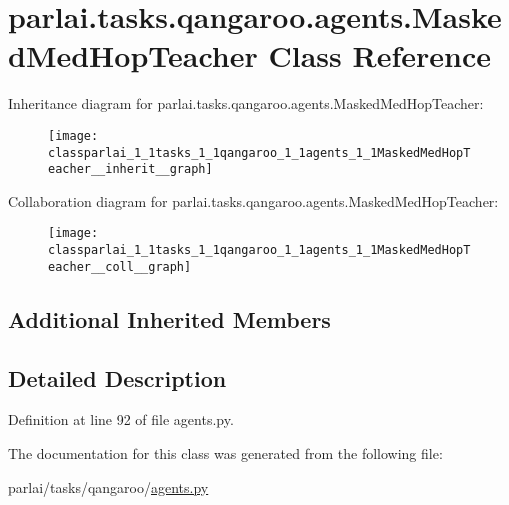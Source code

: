 \hypertarget{classparlai_1_1tasks_1_1qangaroo_1_1agents_1_1MaskedMedHopTeacher}{}\section{parlai.\+tasks.\+qangaroo.\+agents.\+Masked\+Med\+Hop\+Teacher Class Reference}
\label{classparlai_1_1tasks_1_1qangaroo_1_1agents_1_1MaskedMedHopTeacher}


Inheritance diagram for parlai.\+tasks.\+qangaroo.\+agents.\+Masked\+Med\+Hop\+Teacher\+:
\nopagebreak
\begin{figure}[H]
\begin{center}
\leavevmode
\texttt{[image: classparlai\_1\_1tasks\_1\_1qangaroo\_1\_1agents\_1\_1MaskedMedHopTeacher\_\_inherit\_\_graph]}
\end{center}
\end{figure}


Collaboration diagram for parlai.\+tasks.\+qangaroo.\+agents.\+Masked\+Med\+Hop\+Teacher\+:
\nopagebreak
\begin{figure}[H]
\begin{center}
\leavevmode
\texttt{[image: classparlai\_1\_1tasks\_1\_1qangaroo\_1\_1agents\_1\_1MaskedMedHopTeacher\_\_coll\_\_graph]}
\end{center}
\end{figure}
\subsection*{Additional Inherited Members}


\subsection{Detailed Description}


Definition at line 92 of file agents.\+py.



The documentation for this class was generated from the following file\+:\begin{DoxyCompactItemize}
\item 
parlai/tasks/qangaroo/\hyperlink{parlai_2tasks_2qangaroo_2agents_8py}{agents.\+py}\end{DoxyCompactItemize}
